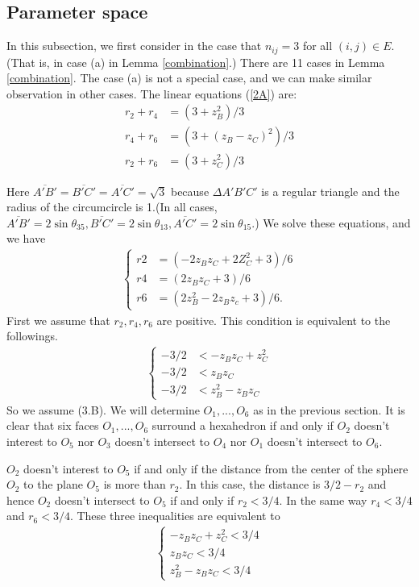 \documentclass[suppldata, dvipdfmx]{interact}
\theoremstyle{plain}%
\theoremstyle{definition}
\theoremstyle{remark}
\theoremstyle{problemstyle}
\begin{document}
\subsection{Parameter space}\label{paramSpace}
In this subsection, we first consider in the case that $n_{ij} = 3$ for all
$(i, j) \in E$. (That is, in case (a) in Lemma \ref{combination}.) There
are 11 cases in Lemma \ref{combination}.
The case (a) is not a special case, and we can make
similar observation in other cases.
The linear equations (\ref{2A}) are:
\begin{align*}
 r_2 + r_4 &= (3 + z_B^2) / 3 \\
 r_4 + r_6 &= (3 + (z_B - z_C)^2 ) / 3 \\
 r_2 + r_6 &= (3 + z_C^2) / 3
\end{align*}

Here $\overline{A'B'} = \overline{B'C'} = \overline{A'C'} = \sqrt{3}$
because $\Delta{A'B'C'}$ is a regular triangle and the radius of the
circumcircle is 1.(In all cases, $\overline{A'B'} = 2\sin\theta_{35},
\overline{B'C'} = 2\sin\theta_{13}, \overline{A'C'} = 2\sin\theta_{15}$.)
We solve these equations, and we have 
\begin{align*}
\begin{cases}
 r2 &= (-2z_Bz_C + 2Z^2_C + 3) / 6 \\
 r4 &= (2z_Bz_C + 3) / 6 \tag{2.C}\label{2C}\\
 r6 &= (2z^2_B - 2z_Bz_c + 3) / 6.
 \end{cases}
\end{align*}
First we assume that $r_2, r_4, r_6$ are positive. This condition is
equivalent to the followings.
\begin{align*}
\begin{cases}
 -3 / 2 &< -z_Bz_C + z^2_C\\
 -3 / 2 &< z_Bz_C \tag{2.D}\label{2D}\\
 -3 / 2 &< z^2_B - z_Bz_C
\end{cases}
\end{align*}
So we assume (3.B). We will determine $O_1, ... , O_6$ as in the
previous section. It is clear that six faces $O_1, ... , O_6$ surround
a hexahedron if and only if $O_2$ doesn't interest to $O_5$ nor $O_3$
doesn't intersect to $O_4$ nor $O_1$ doesn't intersect to $O_6$.

$O_2$ doesn't interest to $O_5$ if and only if the distance from the center
of the sphere $O_2$ to the plane $O_5$ is more than $r_2$. In this case,
the distance is $3 / 2 - r_2$ and hence $O_2$ doesn't intersect to $O_5$
if and only if $r_2 < 3/4$. In the same way $r_4 < 3/4$ and $r_6 <
3/4$. These three inequalities are equivalent to
\begin{align*}
\begin{cases}
 -z_Bz_C + z^2_C < 3 / 4\\
 z_Bz_C < 3 / 4 \tag{2.E}\label{2E}\\
 z^2_B - z_B z_C < 3/ 4
\end{cases}
\end{align*}
\end{document}
